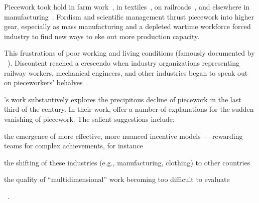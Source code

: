 \documentclass[trackingWork]{subfiles}
\begin{document}
Piecework took hold in farm work~\cite{hughRaynbirdTaskWork},
in textiles~\cite{restructuringPieceworkBaker,riisOtherSideLives},
on railroads~\cite{Brown01041990}, and 
elsewhere in manufacturing~\cite{10.2307/3827491}.
Fordism and scientific management thrust piecework into higher gear, especially as
mass manufacturing and
a depleted wartime workforce forced industry to find new ways to eke out more production capacity.

This frustrations of poor working and living conditions
(famously documented by
\citeauthor{riisOtherSideLives}~\cite{riisOtherSideLives}).
Discontent reached a crescendo when industry organizations representing
railway workers, mechanical engineers, and other industries began to speak out on pieceworkers' behalves~\cite{american1921problem,richards1904anything}.

\citeauthor{hart2013rise}'s work substantively explores the precipitous decline of piecework in the last third of the  century.
In their work, \citeauthor{hart2013rise} offer a number of explanations for the sudden vanishing of piecework.
The salient suggestions include:
\begin{inlinelist}
\item the emergence of more effective, more nuanced incentive models
--- rewarding teams for complex achievements, for instance
\item the shifting of these industries (e.g., manufacturing, clothing)
to other countries
\item the quality of ``multidimensional'' work becoming too difficult to evaluate
\end{inlinelist}~\cite{hart2013rise}.
\end{document}

